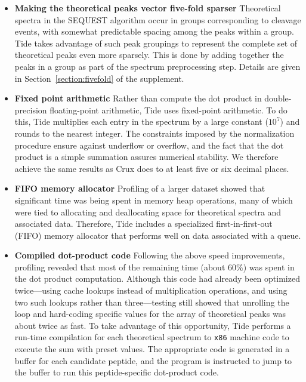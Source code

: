 \begin{itemize}
\item {\bf Making the theoretical peaks vector five-fold sparser}
  Theoretical spectra in the SEQUEST algorithm occur in groups
  corresponding to cleavage events, with somewhat predictable spacing
  among the peaks within a group. Tide takes advantage of such peak
  groupings to represent the complete set of theoretical peaks even
  more sparsely. This is done by adding together the peaks in a group
  as part of the spectrum preprocessing step. Details are given in
  Section~\ref{section:fivefold} of the supplement.

\item {\bf Fixed point arithmetic} Rather than compute the dot product
  in double-precision floating-point arithmetic, Tide uses fixed-point
  arithmetic. To do this, Tide multiplies each entry in the spectrum
  by a large constant ($10^7$) and rounds to the nearest integer. The
  constraints imposed by the normalization procedure ensure against
  underflow or overflow, and the fact that the dot product is a simple
  summation assures numerical stability. We therefore achieve the same
  results as Crux does to at least five or six decimal places.

\item {\bf FIFO memory allocator} Profiling of a larger dataset showed
  that significant time was being spent in memory heap operations,
  many of which were tied to allocating and deallocating space for
  theoretical spectra and associated data. Therefore, Tide includes a
  specialized first-in-first-out (FIFO) memory allocator that performs
  well on data associated with a queue.

\item {\bf Compiled dot-product code} Following the above speed
  improvements, profiling revealed that most of the remaining time
  (about $60\%$) was spent in the dot product computation.  Although
  this code had already been optimized twice---using cache lookups
  instead of multiplication operations, and using two such lookups
  rather than three---testing still showed that unrolling the loop
  and hard-coding specific values for the array of theoretical peaks
  was about twice as fast.  To take advantage of this opportunity,
  Tide performs a run-time compilation for each theoretical spectrum
  to {\tt x86} machine code to execute the sum with preset values. The
  appropriate code is generated in a buffer for each candidate
  peptide, and the program is instructed to jump to the buffer to run
  this peptide-specific dot-product code.

\end{itemize}


